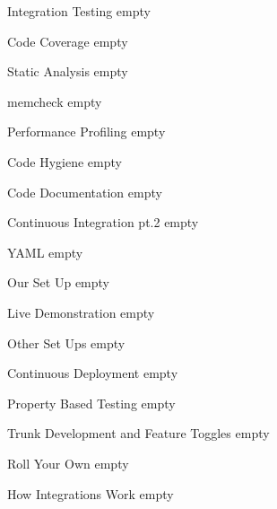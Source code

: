 \documentclass{beamer}
\begin{document}
\begin{frame}{Integration Testing}
	empty
\end{frame}

\begin{frame}{Code Coverage}
	empty
\end{frame}

\begin{frame}{Static Analysis}
	empty
\end{frame}

\begin{frame}{memcheck}
	empty
\end{frame}

\begin{frame}{Performance Profiling}
	empty
\end{frame}

\begin{frame}{Code Hygiene}
	empty
\end{frame}

\begin{frame}{Code Documentation}
	empty
\end{frame}

\begin{frame}{Continuous Integration pt.2}
	empty
\end{frame}

\begin{frame}{YAML}
	empty
\end{frame}

\begin{frame}{Our Set Up}
	empty
\end{frame}

\begin{frame}{Live Demonstration}
	empty
\end{frame}

\begin{frame}{Other Set Ups}
	empty
\end{frame}

\begin{frame}{Continuous Deployment}
	empty
\end{frame}

\begin{frame}{Property Based Testing}
	empty
\end{frame}

\begin{frame}{Trunk Development and Feature Toggles}
	empty
\end{frame}

\begin{frame}{Roll Your Own}
	empty
\end{frame}

\begin{frame}{How Integrations Work}
	empty
\end{frame}
\end{document}

